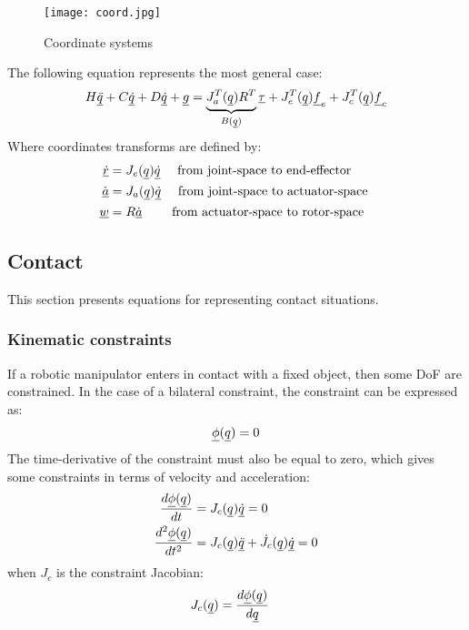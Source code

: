 %
\begin{figure}[t]
	\centering
	\texttt{[image: coord.jpg]}
	\caption{Coordinate systems}%
	\label{fig:coord}
\end{figure}
%
The following equation represents the most general case:
%
\begin{align}
	H \underline{\ddot{q}} + C \underline{\dot{q}} + D \underline{\dot{q}} + \underline{g} =  \underbrace{ J_a^T(\underline{q}) R^T }_{B(\underline{q})}  \underline{\tau} + J_e^T(\underline{q}) \underline{f}_e + J_c^T(\underline{q}) \underline{f}_c
	\label{eq:manipulator_gen}
\end{align}
%
Where coordinates transforms are defined by:
%
\begin{align}
	\underline{\dot{r}}   &= J_e( \underline{q} ) \underline{\dot{q} }  \quad \text{ from joint-space to end-effector   } \\
	\underline{\dot{a}}   &= J_a( \underline{q} ) \underline{\dot{q} }  \quad \text{ from joint-space to actuator-space } \\
	\underline{w }        &= R              \underline{\dot{a} }  \quad\quad \text{ from actuator-space to rotor-space }
	\label{eq:coord_transform2}
\end{align}
%

\newpage
\subsection{Contact}
\label{sec:contact}

This section presents equations for representing contact situations.

\subsubsection{Kinematic constraints}
\label{sec:constraints}
%
If a robotic manipulator enters in contact with a fixed object, then some DoF are constrained. In the case of a bilateral constraint, the constraint can be expressed as:
\begin{align}
	\underline{\phi}( \underline{ q } ) = 0
	\label{eq:constraint}
\end{align}
%
The time-derivative of the constraint must also be equal to zero, which gives some constraints in terms of velocity and acceleration:
\begin{align}
	\frac{d \underline{\phi}( \underline{ q } ) }{dt}     &= J_c( \underline{ q } ) \underline{\dot{q}}  = 0 \\
	\frac{d^2 \underline{\phi}( \underline{ q } ) }{dt^2} &= J_c( \underline{ q } ) \underline{\ddot{q}}  + \dot{J}_c( \underline{ q } ) \underline{\dot{q}} = 0
	\label{eq:constraint_diff}
\end{align}
%
when $J_c$ is the constraint Jacobian:
%
\begin{align}
	J_c( \underline{ q } )                    &= \frac{d \underline{\phi}( \underline{ q } ) }{d\underline{ q }}
	\label{eq:constraint_jaco}
\end{align}

